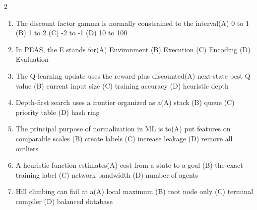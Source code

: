 \documentclass[a4paper]{article}
\begin{document}
\begin{multicols*}{2}
\begin{enumerate}[resume]
\item The discount factor gamma is normally constrained to the interval\newline\hspace*{0.6em}(A) 0 to 1 \quad (B) 1 to 2 \newline\hspace*{0.6em}(C) -2 to -1 \quad (D) 10 to 100
\item In PEAS, the E stands for\newline\hspace*{0.6em}(A) Environment \quad (B) Execution \newline\hspace*{0.6em}(C) Encoding \quad (D) Evaluation
\item The Q-learning update uses the reward plus discounted\newline\hspace*{0.6em}(A) next-state best Q value \quad (B) current input size \newline\hspace*{0.6em}(C) training accuracy \quad (D) heuristic depth
\item Depth-first search uses a frontier organized as a\newline\hspace*{0.6em}(A) stack \quad (B) queue \newline\hspace*{0.6em}(C) priority table \quad (D) hash ring
\item The principal purpose of normalization in ML is to\newline\hspace*{0.6em}(A) put features on comparable scales \quad (B) create labels \newline\hspace*{0.6em}(C) increase leakage \quad (D) remove all outliers
\item A heuristic function estimates\newline\hspace*{0.6em}(A) cost from a state to a goal \quad (B) the exact training label \newline\hspace*{0.6em}(C) network bandwidth \quad (D) number of agents
\item Hill climbing can fail at a\newline\hspace*{0.6em}(A) local maximum \quad (B) root node only \newline\hspace*{0.6em}(C) terminal compiler \quad (D) balanced database

\end{enumerate}
\end{multicols*}
\end{document}
